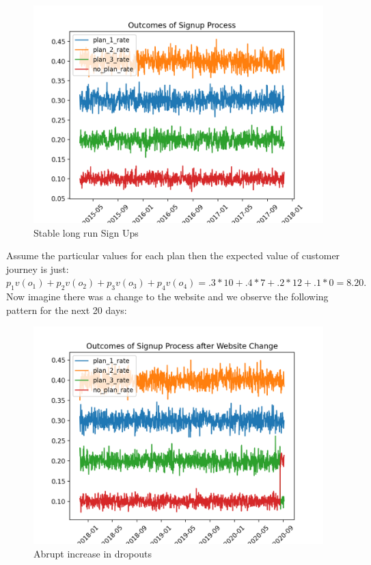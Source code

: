 \documentclass[10pt,a4paper,notitlepage, twocolumn]{article}
\begin{document}
\begin{figure}[H]
  \includegraphics[width=\linewidth]{./Plots/outcomes_of_signup.png}
  \caption{Stable long run Sign Ups }
\end{figure}

Assume the particular values for each plan then the expected value of customer journey is just: $ p_{1}v(o_{1}) + p_{2}v(o_{2}) + p_{3}v(o_{3}) + p_{4}v(o_{4})  = .3*10 + .4*7  + .2*12 + .1*0 = 8.20.$ Now imagine there was a change to the website and we observe the following pattern for the next 20 days:

\begin{figure}[H]
  \includegraphics[width=\linewidth]{./Plots/outcomes_of_signup_post.png}
  \caption{Abrupt increase in dropouts}
\end{figure}
\end{document}
